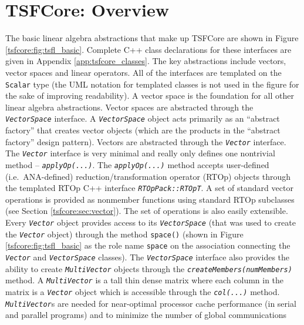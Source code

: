 %
\section{TSFCore: Overview}
\label{tsfcore:sec:TSFCore_core_overview}
%

The basic linear algebra abstractions that make up TSFCore are shown in
Figure \ref{tsfcore:fig:tsfl_basic}.  Complete C++ class declarations
for these interfaces are given in Appendix \ref{app:tsfcore_classes}.
The key abstractions include
vectors, vector spaces and linear operators.  All of the interfaces
are templated on the \texttt{Scalar} type (the UML notation for
templated classes is not used in the figure for the sake of improving
readability).  A vector space is the foundation for all other linear
algebra abstractions.  Vector spaces are abstracted through the
\texttt{\textit{VectorSpace}} interface.  A
\texttt{\textit{VectorSpace}} object acts primarily as an ``abstract
factory'' \cite{ref:gama_et_al_1995} that creates vector objects
(which are the products in the ``abstract factory'' design pattern).
Vectors are abstracted through the \texttt{\textit{Vector}} interface.
The \texttt{\textit{Vector}} interface is very minimal and really only
defines one nontrivial method -- \texttt{\textit{applyOp(\-...)}}.  The
\texttt{\textit{applyOp(\-...)}} method accepts user-defined
(i.e.~ANA-defined) reduction/transformation operator (RTOp) objects
through the templated RTOp C++ interface
\texttt{\textit{RTOpPack::RTOpT}}.  A set of standard vector
operations is provided as nonmember functions using standard RTOp
subclasses (see Section \ref{tsfcore:sec:vector}).  The set of
operations is also easily extensible.  Every \texttt{\textit{Vector}}
object provides access to its \texttt{\textit{VectorSpace}} (that was
used to create the \texttt{\textit{Vector}} object) through the method
\texttt{space()} (shown in Figure \ref{tsfcore:fig:tsfl_basic} as the
role name \texttt{space} on the association connecting the
\texttt{\textit{Vector}} and \texttt{\textit{VectorSpace}} classes).
The \texttt{\textit{VectorSpace}} interface also provides the ability
to create \texttt{\textit{Multi\-Vector}} objects through the
\texttt{\textit{createMembers(numMembers)}} method.  A
\texttt{\textit{Multi\-Vector}} is a tall thin dense matrix where each
column in the matrix is a
\texttt{\textit{Vector}} object which is accessible through the
\texttt{\textit{col(...)}} method.  \texttt{\textit{Multi\-Vector}}s
are needed for near-optimal processor cache performance (in serial and
parallel programs) and to minimize the number of global communications
